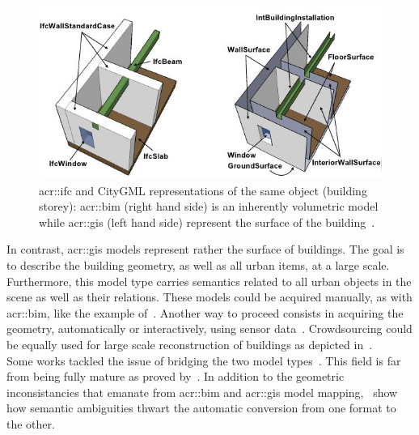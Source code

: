             \begin{figure}[htpb]
                \centering
                \includegraphics[width=\textwidth]{images/introduction/bim_vs_gis}            
                \caption{
                    \label{fig::bim_vs_gis} \gls{acr::ifc} and CityGML representations of the same object (building storey): \gls{acr::bim} (right hand side) is an inherently volumetric model while \gls{acr::gis} (left hand side) represent the surface of the building~\parencite{nagel2009conceptual}.
                }
            \end{figure}

            In contrast, \gls{acr::gis} models represent rather the surface of buildings.
            The goal is to describe the building geometry, as well as all urban items, at a large scale.
            Furthermore, this model type carries semantics related to all urban objects in the scene as well as their relations.
            These models could be acquired manually, as with \gls{acr::bim}, like the example of~\textcite{ref3dnat}.
            Another way to proceed consists in acquiring the geometry, automatically or interactively, using sensor data~\parencite{musialski2013survey}.
            Crowdsourcing could be equally used for large scale reconstruction of buildings as depicted in~\textcite{uden2013open}.\\

            Some works tackled the issue of bridging the two model types~\parencite{deng2016mapping}.
            This field is far from being fully mature as proved by~\textcite{stoter2018geo}.
            In addition to the geometric inconsistancies that emanate from \gls{acr::bim} and \gls{acr::gis} model mapping,~\textcite{stoter2018geo} show how semantic ambiguities thwart the automatic conversion from one format to the other.\\

